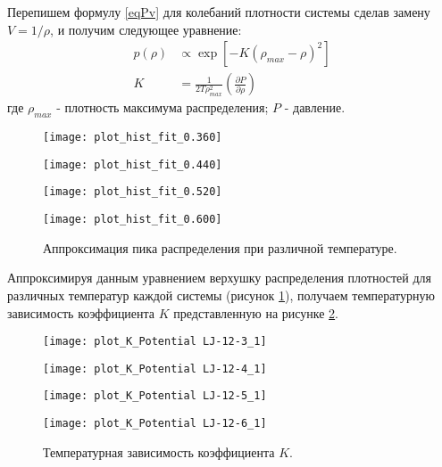 Перепишем формулу \ref{eqPv} для колебаний плотности системы сделав замену $V = 1 / \rho$, и получим следующее уравнение:
\begin{equation}
\begin{aligned}
p(\rho) &\varpropto \exp \left[ - K \left(\rho_{max}- \rho \right)^2 \right] \\
K &= \frac{1}{2T\rho_{max}^2} \left( \frac{\partial P}{\partial \rho} \right)
\end{aligned}
\label{eqFitRho}
\end{equation}
где $\rho_{max}$ - плотность максимума распределения; $P$ - давление.


\begin{figure}[htbp!]
\begin{center}
\begin{minipage}[h]{0.45\linewidth}
\texttt{[image: plot\_hist\_fit\_0.360]}
\end{minipage}
\begin{minipage}[h]{0.45\linewidth}
\texttt{[image: plot\_hist\_fit\_0.440]}
\end{minipage}

\begin{minipage}[h]{0.45\linewidth}
\texttt{[image: plot\_hist\_fit\_0.520]}
\end{minipage}
\begin{minipage}[h]{0.45\linewidth}
\texttt{[image: plot\_hist\_fit\_0.600]}
\end{minipage}
\caption{Аппроксимация пика распределения при различной температуре.}
\label{risHistFit}
\end{center}
\end{figure}

Аппроксимируя данным уравнением верхушку распределения плотностей для различных температур каждой системы (рисунок \ref{risHistFit}), получаем температурную зависимость коэффициента $K$ представленную на рисунке \ref{risK}.


\begin{figure}[htbp!]
\begin{center}
\begin{minipage}[h]{0.45\linewidth}
\texttt{[image: plot\_K\_Potential LJ-12-3\_1]}
\end{minipage}
\begin{minipage}[h]{0.45\linewidth}
\texttt{[image: plot\_K\_Potential LJ-12-4\_1]}
\end{minipage}


\begin{minipage}[h]{0.45\linewidth}
\texttt{[image: plot\_K\_Potential LJ-12-5\_1]}
\end{minipage}
\begin{minipage}[h]{0.45\linewidth}
\texttt{[image: plot\_K\_Potential LJ-12-6\_1]}
\end{minipage}
\caption{Температурная зависимость коэффициента $K$.}
\label{risK}
\end{center}
\end{figure}

